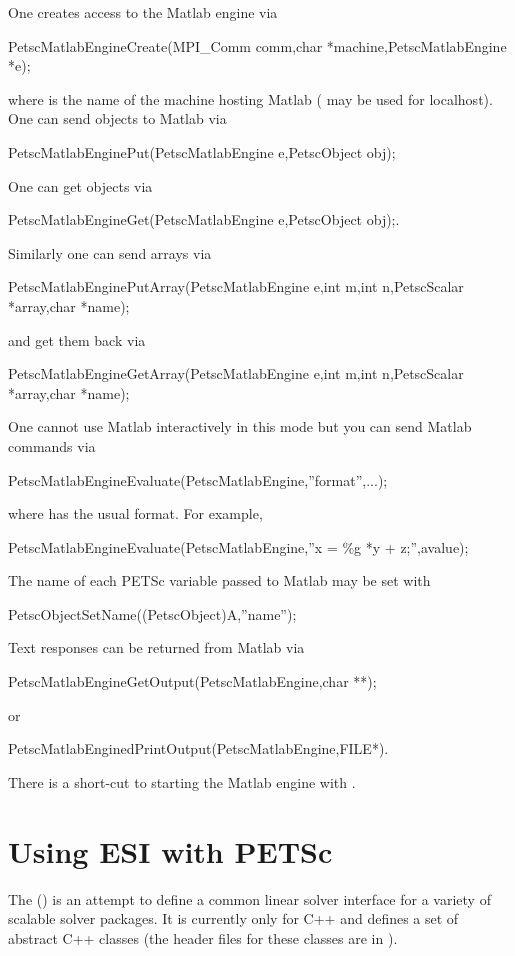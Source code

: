 One creates access to the Matlab engine via 
\begin{tabbing}
  PetscMatlabEngineCreate(MPI\_Comm comm,char *machine,PetscMatlabEngine *e);
\end{tabbing}
where  is the name of the machine hosting Matlab ( may be used for localhost).
One can send objects to Matlab via 
\begin{tabbing}
  PetscMatlabEnginePut(PetscMatlabEngine e,PetscObject obj);
\end{tabbing}
One can get objects
via 
\begin{tabbing}
  PetscMatlabEngineGet(PetscMatlabEngine e,PetscObject obj);.
\end{tabbing}
Similarly one can send arrays via
\begin{tabbing}
  PetscMatlabEnginePutArray(PetscMatlabEngine e,int m,int n,PetscScalar *array,char *name);
\end{tabbing}
and get them back via
\begin{tabbing}
  PetscMatlabEngineGetArray(PetscMatlabEngine e,int m,int n,PetscScalar *array,char *name);
\end{tabbing}
One cannot use Matlab
interactively in this mode but you can send Matlab commands via
\begin{tabbing}
  PetscMatlabEngineEvaluate(PetscMatlabEngine,''format'',...);
\end{tabbing}
where  has the usual  format.
For example,
\begin{tabbing}
  PetscMatlabEngineEvaluate(PetscMatlabEngine,''x = \%g *y + z;'',avalue);
\end{tabbing}
The name of each PETSc variable passed to Matlab may be set with
\begin{tabbing}
PetscObjectSetName((PetscObject)A,''name'');
\end{tabbing}

Text responses can be returned from Matlab via 
\begin{tabbing}
  PetscMatlabEngineGetOutput(PetscMatlabEngine,char **); 
\end{tabbing}
or
\begin{tabbing}
PetscMatlabEnginedPrintOutput(PetscMatlabEngine,FILE*).
\end{tabbing}
There is a short-cut to starting the Matlab engine
with .


\chapter{Using ESI with PETSc}
\label{ch_esi}  
The  
() 
is an attempt to 
define a common linear solver interface for a variety of scalable solver
packages. It is currently only for C++ and defines a set of abstract
C++ classes (the header files for these classes are in ).

